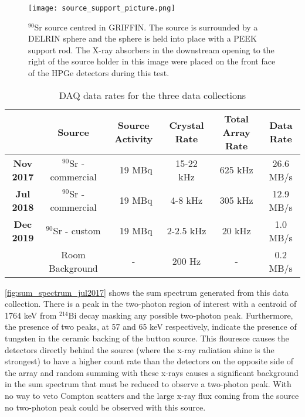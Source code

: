 \documentclass[cnatzke_thesis_proposal.tex]{subfiles}
\begin{document}
\begin{figure}[htbp]
  \centering
  \texttt{[image: source\_support\_picture.png]}
  \caption{$^{90}$Sr source centred in GRIFFIN. The source is surrounded by a DELRIN sphere and the sphere is held into place with a PEEK support rod. The X-ray absorbers in the downstream opening to the right of the source holder in this image were placed on the front face of the HPGe detectors during this test.}
  \label{fig:source_support_picture}
\end{figure}


\begin{table}[]
  \centering
  \begin{tabular}{cccccc}
                    & Source                  & Source Activity & Crystal Rate & Total Array Rate & Data Rate \\ \hline
  \textbf{Nov 2017} & $^{90}$Sr - commercial  & ~19 MBq         & 15-22 kHz    & 625 kHz          & 26.6 MB/s \\ \hline
  \textbf{Jul 2018} & $^{90}$Sr - commercial  & ~19 MBq         & 4-8 kHz      & 305 kHz          & 12.9 MB/s \\ \hline
  \textbf{Dec 2019} & $^{90}$Sr - custom      & ~19 MBq         & 2-2.5 kHz    & 20 kHz           & 1.0 MB/s  \\
                    & Room Background         & -               & 200 Hz       & -                & 0.2 MB/s  \\ \hline
  \end{tabular}
  \caption{DAQ data rates for the three data collections}
  \label{tab:daq_rates}
\end{table}

\ref{fig:sum_spectrum_jul2017} shows the sum spectrum generated from this data collection.
There is a peak in the two-photon region of interest with a centroid of 1764 keV from $^{214}$Bi decay masking any possible two-photon peak.
Furthermore, the presence of two peaks, at 57 and 65 keV respectively, indicate the presence of tungsten in the ceramic backing of the button source.
This flouresce causes the detectors directly behind the source (where the x-ray radiation shine is the strongest) to have a higher count rate than the detectors on the opposite side of the array and random summing with these x-rays causes a significant background in the sum spectrum that must be reduced to observe a two-photon peak. 
With no way to veto Compton scatters and the large x-ray flux coming from the source no two-photon peak could be observed with this source.
\end{document}

